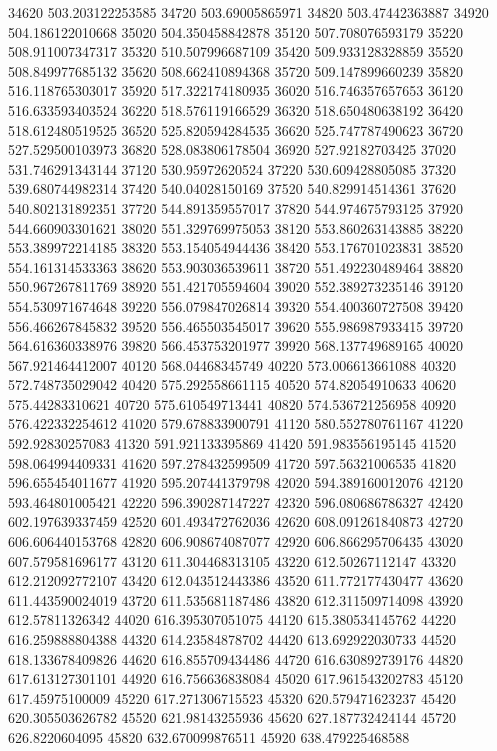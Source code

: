 {34620 503.203122253585
34720 503.69005865971
34820 503.47442363887
34920 504.186122010668
35020 504.350458842878
35120 507.708076593179
35220 508.911007347317
35320 510.507996687109
35420 509.933128328859
35520 508.849977685132
35620 508.662410894368
35720 509.147899660239
35820 516.118765303017
35920 517.322174180935
36020 516.746357657653
36120 516.633593403524
36220 518.576119166529
36320 518.650480638192
36420 518.612480519525
36520 525.820594284535
36620 525.747787490623
36720 527.529500103973
36820 528.083806178504
36920 527.92182703425
37020 531.746291343144
37120 530.95972620524
37220 530.609428805085
37320 539.680744982314
37420 540.04028150169
37520 540.829914514361
37620 540.802131892351
37720 544.891359557017
37820 544.974675793125
37920 544.660903301621
38020 551.329769975053
38120 553.860263143885
38220 553.389972214185
38320 553.154054944436
38420 553.176701023831
38520 554.161314533363
38620 553.903036539611
38720 551.492230489464
38820 550.967267811769
38920 551.421705594604
39020 552.389273235146
39120 554.530971674648
39220 556.079847026814
39320 554.400360727508
39420 556.466267845832
39520 556.465503545017
39620 555.986987933415
39720 564.616360338976
39820 566.453753201977
39920 568.137749689165
40020 567.921464412007
40120 568.04468345749
40220 573.006613661088
40320 572.748735029042
40420 575.292558661115
40520 574.82054910633
40620 575.44283310621
40720 575.610549713441
40820 574.536721256958
40920 576.422332254612
41020 579.678833900791
41120 580.552780761167
41220 592.92830257083
41320 591.921133395869
41420 591.983556195145
41520 598.064994409331
41620 597.278432599509
41720 597.56321006535
41820 596.655454011677
41920 595.207441379798
42020 594.389160012076
42120 593.464801005421
42220 596.390287147227
42320 596.080686786327
42420 602.197639337459
42520 601.493472762036
42620 608.091261840873
42720 606.606440153768
42820 606.908674087077
42920 606.866295706435
43020 607.579581696177
43120 611.304468313105
43220 612.50267112147
43320 612.212092772107
43420 612.043512443386
43520 611.772177430477
43620 611.443590024019
43720 611.535681187486
43820 612.311509714098
43920 612.57811326342
44020 616.395307051075
44120 615.380534145762
44220 616.259888804388
44320 614.23584878702
44420 613.692922030733
44520 618.133678409826
44620 616.855709434486
44720 616.630892739176
44820 617.613127301101
44920 616.756636838084
45020 617.961543202783
45120 617.45975100009
45220 617.271306715523
45320 620.579471623237
45420 620.305503626782
45520 621.98143255936
45620 627.187732424144
45720 626.8220604095
45820 632.670099876511
45920 638.479225468588
}

